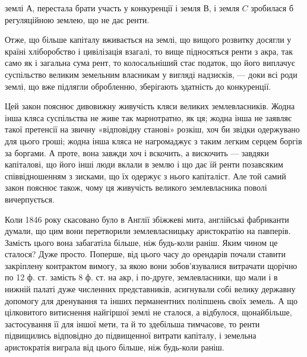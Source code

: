 \parcont{}  %
землі $А$, перестала брати участь у конкуренції і земля $В$, і земля $C$ зробилася б
регуляційною землею, що не дає ренти.

Отже, що більше капіталу вживається на землі, що вищого розвитку досягли
у країні хліборобство і цивілізація взагалі, то вище підносяться ренти
з акра, так само як і загальна сума рент, то колосальніший стає податок, що
його виплачує суспільство великим земельним власникам у вигляді надзисків, — доки
всі роди землі, що вже підлягли обробленню, зберігають здатність до конкуренції.

Цей закон пояснює дивовижну живучість кляси великих землевласників.
Жодна інша кляса суспільства не живе так марнотратно, як ця; жодна інша
не заявляє такої претенсії на звичну «відповідну станові» розкіш, хоч би звідки
одержувано для цього гроші; жодна інша кляса не нагромаджує з таким легким
серцем боргів за боргами. А проте, вона завжди хоч і вскочить, а вискочить —
завдяки капіталові, що його інші люди вклали в землю і що дає їй ренти позавсяким
співвідношенням з зисками, що їх одержує з нього капіталіст. Але той самий закон
пояснює також, чому ця живучість великого землевласника поволі вичерпується.

Коли 1846 року скасовано було в Англії збіжжеві мита, англійські фабриканти
думали, що цим вони перетворили землевласницьку аристократію на
павперів. Замість цього вона забагатіла більше, ніж будь-коли раніш. Яким
чином це сталося? Дуже просто. Поперше, від цього часу до орендарів почали
ставити закріплену контрактом вимогу, за якою вони зобов’язувалися витрачати
щорічно по 12 ф. ст. замість 8 ф. ст. на акр, і по-друге, землевласники, що мали і в
нижній палаті дуже численних представників, асигнували собі велику державну
допомогу для дренування та інших перманентних поліпшень своїх земель. А що
цілковитого витиснення найгіршої землі не сталося, а відбулося, щонайбільше,
застосування її для іншої мети, та й то здебільша тимчасове, то ренти підвищились
відповідно до підвищенної витрати капіталу, і земельна аристократія
виграла від цього більше, ніж будь-коли раніш.

